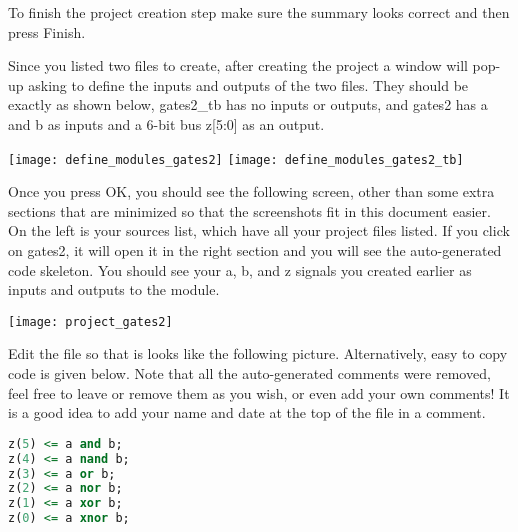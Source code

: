 To finish the project creation step make sure the summary looks correct and then press Finish.

\begin{center}
\end{center}

Since you listed two files to create, after creating the project a window will pop-up asking to
define the inputs and outputs of the two files.
They should be exactly as shown below, gates2\_tb has no inputs or outputs, and gates2 has a and b
as inputs and a 6-bit bus z[5:0] as an output.

\begin{center}
    \texttt{[image: define\_modules\_gates2]}
    \texttt{[image: define\_modules\_gates2\_tb]}
\end{center}

Once you press OK, you should see the following screen, other than some extra sections that are
minimized so that the screenshots fit in this document easier.
On the left is your sources list, which have all your project files listed.
If you click on gates2, it will open it in the right section and you will see the auto-generated
code skeleton.
You should see your a, b, and z signals you created earlier as inputs and outputs to the module.

\begin{center}
    \texttt{[image: project\_gates2]}
\end{center}

Edit the file so that is looks like the following picture.
Alternatively, easy to copy code is given below.
Note that all the auto-generated comments were removed, feel free to leave or remove them as
you wish, or even add your own comments! It is a good idea to add your name and date at the top
of the file in a comment.

\begin{lstlisting}[language=VHDL]
z(5) <= a and b;
z(4) <= a nand b;
z(3) <= a or b;
z(2) <= a nor b;
z(1) <= a xor b;
z(0) <= a xnor b;
\end{lstlisting}

